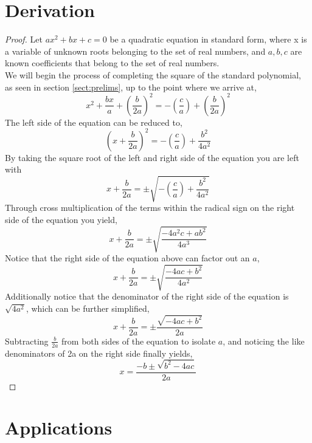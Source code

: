 \documentclass{article}
\theoremstyle{plain}
\theoremstyle{definition}
\begin{document}
\section{Derivation}    \label{sect:derive}
    \begin{proof}
    
    Let $ax^2+bx+c=0$ be a quadratic equation in standard form, where x is a variable of unknown roots belonging to the set of real numbers, and $a,b,c$ are known coefficients that belong to the set of real numbers.\\
    We will begin the process of completing the square of the standard polynomial, as seen in section \ref{sect:prelims}, up to the point where we arrive at,
    $$x^2+\frac{bx}{a}+(\frac{b}{2a})^2=-(\frac{c}{a})+(\frac{b}{2a})^2$$
    The left side of the equation can be reduced to,
    $$(x+\frac{b}{2a})^2=-(\frac{c}{a})+\frac{b^2}{4a^2}$$
    By taking the square root of the left and right side of the equation you are left with
    $$x+\frac{b}{2a}=\pm\sqrt{-(\frac{c}{a})+\frac{b^2}{4a^2}}$$
    Through cross multiplication of the terms within the radical sign on the right side of the equation you yield,
    $$x+\frac{b}{2a}=\pm\sqrt{\frac{-4a^2c+ab^2}{4a^3}}$$
    Notice that the right side of the equation above can factor out an $a$,
    $$x+\frac{b}{2a}=\pm\sqrt{\frac{-4ac+b^2}{4a^2}}$$
    Additionally notice that the denominator of the right side of the equation is $\sqrt{4a^2}$, which can be further simplified,
    $$x+\frac{b}{2a}={\pm\frac{\sqrt{-4ac+b^2}}{2a}}$$
    Subtracting $\frac{b}{2a}$ from both sides of the equation to isolate $a$, and noticing the like denominators of 2a on the right side finally yields,
     $$x=\frac{-b\pm\sqrt{b^2-4ac}}{2a}$$
    \end{proof}
\section{Applications}  \label{sect:application}

\begin{thebibliography}{100}
       
\end{thebibliography}
\end{document}
